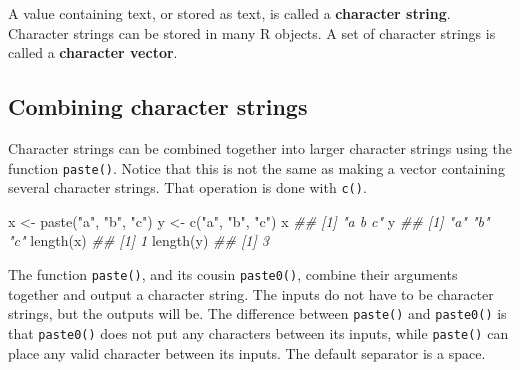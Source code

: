 \documentclass[
  13,
  letterpaper,
]{report}
\newenvironment{Shaded}{\begin{snugshade}}{\end{snugshade}}
\newcommand{\DocumentationTok}[1]{\textcolor[rgb]{0.37,0.37,0.37}{\textit{#1}}}
\newcommand{\FunctionTok}[1]{\textcolor[rgb]{0.28,0.35,0.67}{#1}}
\newcommand{\NormalTok}[1]{\textcolor[rgb]{0.00,0.23,0.31}{#1}}
\newcommand{\OtherTok}[1]{\textcolor[rgb]{0.00,0.23,0.31}{#1}}
\newcommand{\StringTok}[1]{\textcolor[rgb]{0.13,0.47,0.30}{#1}}
\begin{document}
A value containing text, or stored as text, is called a
\textbf{character string}. Character strings can be stored in many R
objects. A set of character strings is called a \textbf{character
vector}.

\subsection{Combining character strings}\label{sec-manip-char-comb}

Character strings can be combined together into larger character strings
using the function \texttt{paste()}. Notice that this is not the same as
making a vector containing several character strings. That operation is
done with \texttt{c()}.

\begin{Shaded}
\begin{Highlighting}[]

\NormalTok{x }\OtherTok{\textless{}{-}} \FunctionTok{paste}\NormalTok{(}\StringTok{"a"}\NormalTok{, }\StringTok{"b"}\NormalTok{, }\StringTok{"c"}\NormalTok{)}
\NormalTok{y }\OtherTok{\textless{}{-}} \FunctionTok{c}\NormalTok{(}\StringTok{"a"}\NormalTok{, }\StringTok{"b"}\NormalTok{, }\StringTok{"c"}\NormalTok{)}
\NormalTok{x}
\DocumentationTok{\#\# [1] "a b c"}
\NormalTok{y}
\DocumentationTok{\#\# [1] "a" "b" "c"}
\FunctionTok{length}\NormalTok{(x)}
\DocumentationTok{\#\# [1] 1}
\FunctionTok{length}\NormalTok{(y)}
\DocumentationTok{\#\# [1] 3}
\end{Highlighting}
\end{Shaded}

The function \texttt{paste()}, and its cousin \texttt{paste0()}, combine
their arguments together and output a character string. The inputs do
not have to be character strings, but the outputs will be. The
difference between \texttt{paste()} and \texttt{paste0()} is that
\texttt{paste0()} does not put any characters between its inputs, while
\texttt{paste()} can place any valid character between its inputs. The
default separator is a space.
\end{document}
